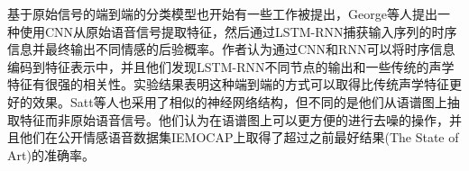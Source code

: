基于原始信号的端到端的分类模型也开始有一些工作被提出，George等人提出一种使用CNN从原始语音信号提取特征，然后通过LSTM-RNN捕获输入序列的时序信息并最终输出不同情感的后验概率。作者认为通过CNN和RNN可以将时序信息编码到特征表示中，并且他们发现LSTM-RNN不同节点的输出和一些传统的声学特征有很强的相关性。实验结果表明这种端到端的方式可以取得比传统声学特征更好的效果。Satt等人也采用了相似的神经网络结构，但不同的是他们从语谱图上抽取特征而非原始语音信号。他们认为在语谱图上可以更方便的进行去噪的操作，并且他们在公开情感语音数据集IEMOCAP上取得了超过之前最好结果(The State of Art)的准确率。









